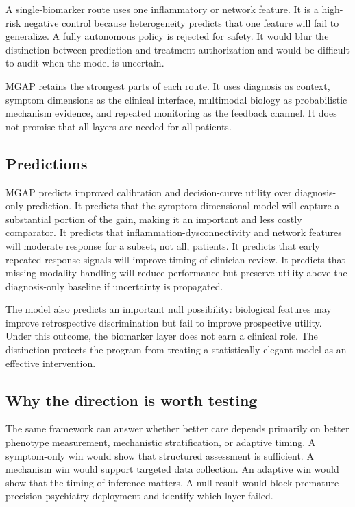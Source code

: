 \documentclass[conference]{IEEEtran}
\begin{document}
A single-biomarker route uses one inflammatory or network feature. It is a high-risk negative control because heterogeneity predicts that one feature will fail to generalize. A fully autonomous policy is rejected for safety. It would blur the distinction between prediction and treatment authorization and would be difficult to audit when the model is uncertain.

MGAP retains the strongest parts of each route. It uses diagnosis as context, symptom dimensions as the clinical interface, multimodal biology as probabilistic mechanism evidence, and repeated monitoring as the feedback channel. It does not promise that all layers are needed for all patients.

\subsection{Predictions}
MGAP predicts improved calibration and decision-curve utility over diagnosis-only prediction. It predicts that the symptom-dimensional model will capture a substantial portion of the gain, making it an important and less costly comparator. It predicts that inflammation-dysconnectivity and network features will moderate response for a subset, not all, patients. It predicts that early repeated response signals will improve timing of clinician review. It predicts that missing-modality handling will reduce performance but preserve utility above the diagnosis-only baseline if uncertainty is propagated.

The model also predicts an important null possibility: biological features may improve retrospective discrimination but fail to improve prospective utility. Under this outcome, the biomarker layer does not earn a clinical role. The distinction protects the program from treating a statistically elegant model as an effective intervention.

\subsection{Why the direction is worth testing}
The same framework can answer whether better care depends primarily on better phenotype measurement, mechanistic stratification, or adaptive timing. A symptom-only win would show that structured assessment is sufficient. A mechanism win would support targeted data collection. An adaptive win would show that the timing of inference matters. A null result would block premature precision-psychiatry deployment and identify which layer failed.
\end{document}

